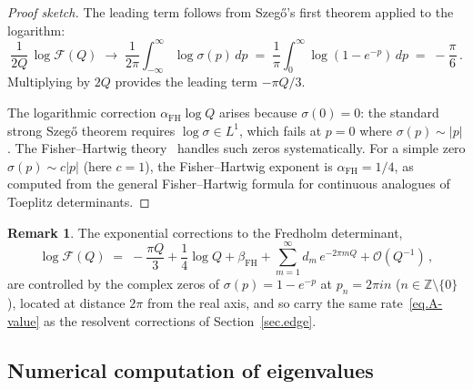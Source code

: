 \documentclass[11pt,a4paper]{article}
\theoremstyle{definition}
\newtheorem{remark}[theorem]{Remark}
\begin{document}
\begin{proof}[Proof sketch]
The leading term follows from Szeg\H{o}'s first theorem applied to the
logarithm:
\begin{equation}
  \frac{1}{2Q}\, \log\mathcal{F}(Q)
  \;\to\;
  \frac{1}{2\pi}
  \int_{-\infty}^{\infty}
    \log\sigma(p)\, dp
  \;=\;
  \frac{1}{\pi}
  \int_0^{\infty}
    \log(1 - e^{-p})\, dp
  \;=\;
  -\frac{\pi}{6}\,.
\end{equation}
Multiplying by $2Q$ provides the leading term $-\pi Q/3$.

The logarithmic correction $\alpha_{\mathrm{FH}} \log Q$ arises because
$\sigma(0) = 0$: the standard strong Szeg\H{o} theorem requires
$\log\sigma \in L^1$, which fails at $p = 0$ where $\sigma(p) \sim |p|$.
The Fisher--Hartwig theory~\cite{bottcher2006analysis} handles such zeros systematically.
For a simple zero $\sigma(p) \sim c|p|$ (here $c = 1$), the Fisher--Hartwig
exponent is $\alpha_{\mathrm{FH}} = 1/4$, as computed from the general
Fisher--Hartwig formula for continuous analogues of Toeplitz
determinants.
\end{proof}

\begin{remark}
The exponential corrections to the Fredholm determinant,
\begin{equation}
  \log \mathcal{F}(Q)
  \;=\;
  -\frac{\pi Q}{3}
  + \frac{1}{4}\log Q
  + \beta_{\mathrm{FH}}
  + \sum_{m=1}^{\infty} d_m\, e^{-2\pi m Q}
  + \mathcal O(Q^{-1})\,,
\end{equation}
are controlled by the complex zeros of $\sigma(p) = 1-e^{-p}$ at
$p_n = 2\pi i n$ ($n \in \mathbb{Z}\setminus\{0\}$), located at
distance $2\pi$ from the real axis, and so carry the same
rate~\eqref{eq.A-value} as the resolvent corrections of
Section~\ref{sec.edge}.
\end{remark}

\subsection{Numerical computation of eigenvalues}\label{subsec.num-eig}
\end{document}
